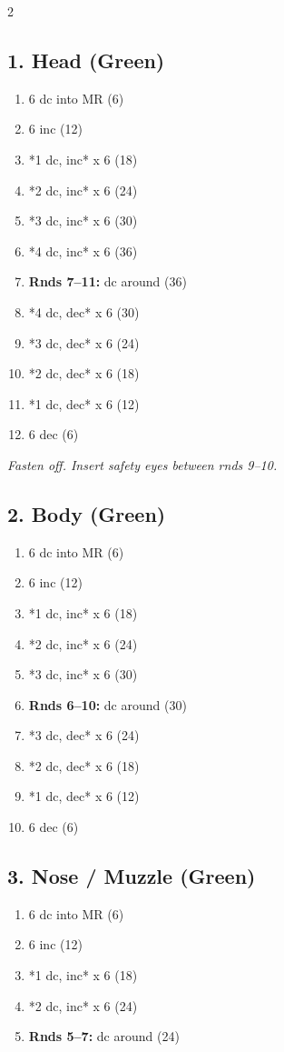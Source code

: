 
\begin{multicols}{2}

\subsection*{1. Head (Green)}
\begin{enumerate}[noitemsep,leftmargin=*]
    \item 6 dc into MR (6)
    \item 6 inc (12)
    \item *1 dc, inc* x 6 (18)
    \item *2 dc, inc* x 6 (24)
    \item *3 dc, inc* x 6 (30)
    \item *4 dc, inc* x 6 (36)
    \item \textbf{Rnds 7--11:} dc around (36)
    \item *4 dc, dec* x 6 (30)
    \item *3 dc, dec* x 6 (24)
    \item *2 dc, dec* x 6 (18)
    \item *1 dc, dec* x 6 (12)
    \item 6 dec (6)
\end{enumerate}
\textit{Fasten off. Insert safety eyes between rnds 9--10.}

\subsection*{2. Body (Green)}
\begin{enumerate}[noitemsep,leftmargin=*]
    \item 6 dc into MR (6)
    \item 6 inc (12)
    \item *1 dc, inc* x 6 (18)
    \item *2 dc, inc* x 6 (24)
    \item *3 dc, inc* x 6 (30)
    \item \textbf{Rnds 6--10:} dc around (30)
    \item *3 dc, dec* x 6 (24)
    \item *2 dc, dec* x 6 (18)
    \item *1 dc, dec* x 6 (12)
    \item 6 dec (6)
\end{enumerate}

\subsection*{3. Nose / Muzzle (Green)}
\begin{enumerate}[noitemsep,leftmargin=*]
    \item 6 dc into MR (6)
    \item 6 inc (12)
    \item *1 dc, inc* x 6 (18)
    \item *2 dc, inc* x 6 (24)
    \item \textbf{Rnds 5--7:} dc around (24)
\end{enumerate}


\end{multicols}
